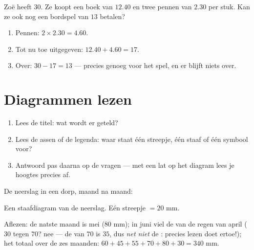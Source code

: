 \begin{example}\label{ex:g5:data:budget}
Zoë heeft $30$. Ze koopt een boek van $12.40$ en twee pennen van $2.30$ per
stuk. Kan ze ook nog een bordspel van $13$ betalen?
\begin{enumerate}
  \item Pennen: $2 \times 2.30 = 4.60$.
  \item Tot nu toe uitgegeven: $12.40 + 4.60 = 17$.
  \item Over: $30 - 17 = 13$ --- precies genoeg voor het spel, en er blijft
        niets over.
\end{enumerate}
\end{example}

\section{Diagrammen lezen}

\begin{method}\label{met:g5:data:read}
\begin{enumerate}
  \item Lees de titel: wat wordt er geteld?
  \item Lees de assen of de legenda: waar staat één streepje, één staaf of
        één symbool voor?
  \item Antwoord pas daarna op de vragen --- met een lat op het diagram lees
        je hoogtes precies af.
\end{enumerate}
\end{method}

\begin{example}\label{ex:g5:data:chart}
De neerslag in een dorp, maand na maand:

\begin{omfigure}

{\small Een staafdiagram van de neerslag. Eén streepje $= 20$ mm.}
\end{omfigure}

Aflezen: de natste maand is mei ($80$ mm); in juni viel de  van de regen
van april ($30$ tegen $70$? nee --- de  van $70$ is $35$, dus
\emph{net niet} de : precies lezen doet ertoe!); het totaal over de zes
maanden: $60 + 45 + 55 + 70 + 80 + 30 = 340$ mm.
\end{example}

